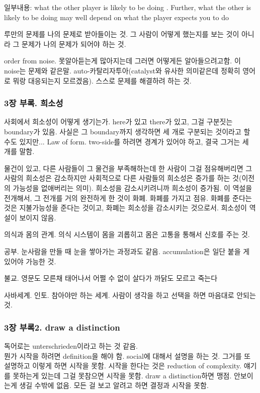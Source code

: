\documentclass[12pt, a4paper]{article}
\begin{document}
일부내용: what the other player is likely to be doing . Further, what the other is likely to be doing may well depend on what the player expects you to do

루만의 문제를 나의 문제로 받아들이는 것. 그 사람이 어떻게 했는지를 보는 것이 아니라 그 문제가 나의 문제가 되어야 하는 것.

order from noise. 못알아듣는게 많아지는데 그러면 어떻게든 알아들으려고함. 이 noise는 문제와 같은말. auto-카탈리자투아(catalyst와 유사한 의미같은데 정확히 영어로 뭐랑 대응되는지 모르겠음). 스스로 문제를 해결하려 하는 것.

\subsubsection{3장 부록. 희소성}
사회에서 희소성이 어떻게 생기는가. here가 있고 there가 있고, 그걸 구분짓는 boundary가 있음. 사실은 그 boundary까지 생각하면 세 개로 구분되는 것이라고 할 수도 있지만... Law of form. two-side를 하려면 경계가 있어야 하고, 결국 그거는 세 개를 말함.

물건이 있고, 다른 사람들이 그 물건을 부족해하는데 한 사람이 그걸 점유해버리면 그 사람의 희소성은 감소하지만 사회적으로 다른 사람들의 희소성은 증가를 하는 것(이전의 가능성을 없애버리는 의미). 희소성을 감소시키려니까 희소성이 증가됨. 이 역설을 전개해서, 그 전개를 거의 완전하게 한 것이 화폐. 화폐를 가지고 점유. 화폐를 준다는 것은 지불가능성을 준다는 것이고, 화폐는 희소성을 감소시키는 것으로서. 희소성이 역설이 보이지 않음.

의식과 몸의 관계. 의식 시스템이 몸을 괴롭히고 몸은 고통을 통해서 신호를 주는 것.

공부. 눈사람을 만들 때 눈을 쌓아가는 과정과도 같음. accumulation은 일단 붙을 게 있어야 가능한 것.

불교. 영문도 모른채 태어나서 어쩔 수 없이 살다가 까닭도 모르고 죽는다

사바세계. 인토. 참아야만 하는 세계. 사람이 생각을 하고 선택을 하면 마음대로 안되는 것. 

\subsubsection{3장 부록2. draw a distinction}
독어로는 unterschrieden이라고 하는 것 같음.\\
뭔가 시작을 하려면 definition을 해야 함. social에 대해서 설명을 하는 것. 그거를 또 설명하고 이렇게 하면 시작을 못함. 시작을 한다는 것은 reduction of complexity. 얘기를 못하는게 있는데 그걸 못참으면 시작을 못함. draw a distinction하면 맹점. 안보이는게 생길 수밖에 없음. 모든 걸 보고 알려고 하면 결정과 시작을 못함.
\end{document}
